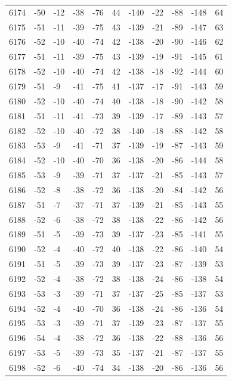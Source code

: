 \begin{table}[H]
\begin{tabular}{lllllllllll}
6174 & -50 & -12 & -38 & -76 & 44 & -140 & -22 & -88 & -148 & 64 \\
6175 & -51 & -11 & -39 & -75 & 43 & -139 & -21 & -89 & -147 & 63 \\
6176 & -52 & -10 & -40 & -74 & 42 & -138 & -20 & -90 & -146 & 62 \\
6177 & -51 & -11 & -39 & -75 & 43 & -139 & -19 & -91 & -145 & 61 \\
6178 & -52 & -10 & -40 & -74 & 42 & -138 & -18 & -92 & -144 & 60 \\
6179 & -51 & -9 & -41 & -75 & 41 & -137 & -17 & -91 & -143 & 59 \\
6180 & -52 & -10 & -40 & -74 & 40 & -138 & -18 & -90 & -142 & 58 \\
6181 & -51 & -11 & -41 & -73 & 39 & -139 & -17 & -89 & -143 & 57 \\
6182 & -52 & -10 & -40 & -72 & 38 & -140 & -18 & -88 & -142 & 58 \\
6183 & -53 & -9 & -41 & -71 & 37 & -139 & -19 & -87 & -143 & 59 \\
6184 & -52 & -10 & -40 & -70 & 36 & -138 & -20 & -86 & -144 & 58 \\
6185 & -53 & -9 & -39 & -71 & 37 & -137 & -21 & -85 & -143 & 57 \\
6186 & -52 & -8 & -38 & -72 & 36 & -138 & -20 & -84 & -142 & 56 \\
6187 & -51 & -7 & -37 & -71 & 37 & -139 & -21 & -85 & -143 & 55 \\
6188 & -52 & -6 & -38 & -72 & 38 & -138 & -22 & -86 & -142 & 56 \\
6189 & -51 & -5 & -39 & -73 & 39 & -137 & -23 & -85 & -141 & 55 \\
6190 & -52 & -4 & -40 & -72 & 40 & -138 & -22 & -86 & -140 & 54 \\
6191 & -51 & -5 & -39 & -73 & 39 & -137 & -23 & -87 & -139 & 53 \\
6192 & -52 & -4 & -38 & -72 & 38 & -138 & -24 & -86 & -138 & 54 \\
6193 & -53 & -3 & -39 & -71 & 37 & -137 & -25 & -85 & -137 & 53 \\
6194 & -52 & -4 & -40 & -70 & 36 & -138 & -24 & -86 & -136 & 54 \\
6195 & -53 & -3 & -39 & -71 & 37 & -139 & -23 & -87 & -137 & 55 \\
6196 & -54 & -4 & -38 & -72 & 36 & -138 & -22 & -88 & -136 & 56 \\
6197 & -53 & -5 & -39 & -73 & 35 & -137 & -21 & -87 & -137 & 55 \\
6198 & -52 & -6 & -40 & -74 & 34 & -138 & -20 & -86 & -136 & 56 \\

\end{tabular}
\end{table}
